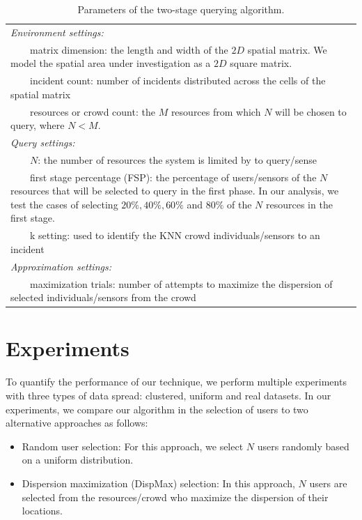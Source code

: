 \documentclass{acm_proc_article-sp}
\newcommand{\tabitem}{~~\llap{\textbullet}~~}
\begin{document}
\begin{table}{}
\centering
\begin{tabulary}{0.5\textwidth}{|L|}
\hline
\textit{Environment settings: }\\
\tabitem matrix dimension: the length and width of the $2D$ spatial matrix. We model the spatial area under investigation as a $2D$ square matrix.\\
\tabitem incident count: number of incidents distributed across the cells of the spatial matrix\\
\tabitem resources or crowd count: the $M$ resources from which $N$ will be chosen to query, where $N < M$.\\
\hline
\textit{Query settings:}\\
\tabitem $N$: the number of resources the system is limited by to query/sense \\
\tabitem first stage percentage (FSP): the percentage of users/sensors of the $N$ resources that will be selected to query in the first phase. In our analysis, we test the cases of selecting $20\%, 40\%, 60\%$ and $80\%$ of the $N$ resources in the first stage.\\
\tabitem k setting: used to identify the KNN crowd individuals/sensors to an incident\\
\hline
\textit{Approximation settings: }\\
\tabitem maximization trials: number of attempts to maximize the dispersion of selected individuals/sensors from the crowd\\
\hline
\end{tabulary}
\caption{Parameters of the two-stage querying algorithm.}
\label{table:systemParameters}
\end{table}

\section{Experiments}
To quantify the performance of our technique, we perform multiple experiments with three types of data spread: clustered, uniform and real datasets. In our experiments, we compare our algorithm in the selection of users to two alternative approaches as follows:
\begin{itemize}
\item Random user selection: For this approach, we select $N$ users randomly based on a uniform distribution.
\item Dispersion maximization (DispMax) selection: In this approach, $N$ users are selected from the resources/crowd who maximize the dispersion of their locations.
\end{itemize}
\end{document}
